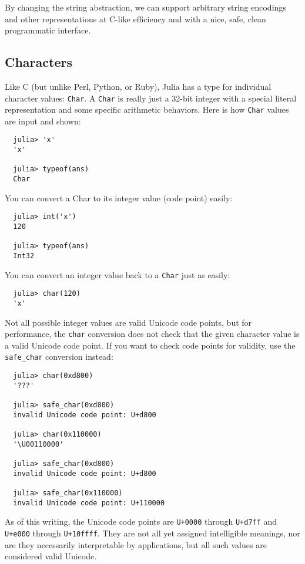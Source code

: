 \documentclass{article}
\begin{document}
By changing the string abstraction, we can support arbitrary string encodings and other representations at C-like efficiency and with a nice, safe, clean programmatic interface.

\subsection{Characters}

Like C (but unlike Perl, Python, or Ruby), Julia has a type for individual character values: \verb|Char|.
A \verb|Char| is really just a 32-bit integer with a special literal representation and some specific arithmetic behaviors.
Here is how \verb|Char| values are input and shown:
\begin{verbatim}
  julia> 'x'
  'x'

  julia> typeof(ans)
  Char
\end{verbatim}
You can convert a Char to its integer value (code point) easily:
\begin{verbatim}
  julia> int('x')
  120

  julia> typeof(ans)
  Int32
\end{verbatim}
You can convert an integer value back to a \verb|Char| just as easily:
\begin{verbatim}
  julia> char(120)
  'x'
\end{verbatim}
Not all possible integer values are valid Unicode code points, but for performance, the \verb|char| conversion does not check that the given character value is a valid Unicode code point.
If you want to check code points for validity, use the \verb|safe_char| conversion instead:
\begin{verbatim}
  julia> char(0xd800)
  '???'

  julia> safe_char(0xd800)
  invalid Unicode code point: U+d800

  julia> char(0x110000)
  '\U00110000'

  julia> safe_char(0xd800)
  invalid Unicode code point: U+d800

  julia> safe_char(0x110000)
  invalid Unicode code point: U+110000
\end{verbatim}
As of this writing, the Unicode code points are \verb|U+0000| through \verb|U+d7ff| and \verb|U+e000| through \verb|U+10ffff|.
They are not all yet assigned intelligible meanings, nor are they necessarily interpretable by applications, but all such values are considered valid Unicode.
\end{document}
